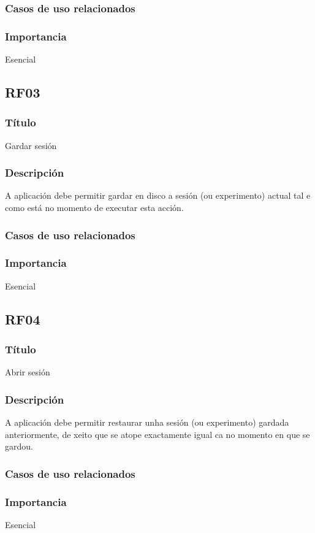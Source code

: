 \subsubsection{Casos de uso relacionados}
\subsubsection{Importancia}
Esencial

\subsection*{RF03}
\subsubsection{Título}
Gardar sesión
\subsubsection{Descripción}
A aplicación debe permitir gardar en disco a sesión (ou experimento) actual tal e como está no momento de executar esta acción.
\subsubsection{Casos de uso relacionados}
\subsubsection{Importancia}
Esencial

\subsection*{RF04}
\subsubsection{Título}
Abrir sesión
\subsubsection{Descripción}
A aplicación debe permitir restaurar unha sesión (ou experimento) gardada anteriormente, de xeito que se atope exactamente igual ca no momento en que se gardou.
\subsubsection{Casos de uso relacionados}
\subsubsection{Importancia}
Esencial

